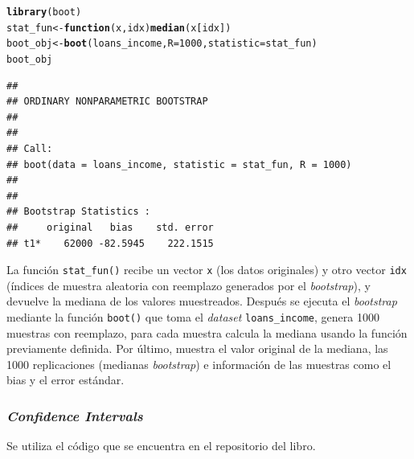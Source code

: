\documentclass[12pt]{article}\usepackage[]{graphicx}\usepackage[]{xcolor}
\makeatletter
\newcommand{\hlnum}[1]{\textcolor[rgb]{0.686,0.059,0.569}{#1}}%
\newcommand{\hldef}[1]{\textcolor[rgb]{0.345,0.345,0.345}{#1}}%
\newcommand{\hlkwa}[1]{\textcolor[rgb]{0.161,0.373,0.58}{\textbf{#1}}}%
\newcommand{\hlkwb}[1]{\textcolor[rgb]{0.69,0.353,0.396}{#1}}%
\newcommand{\hlkwc}[1]{\textcolor[rgb]{0.333,0.667,0.333}{#1}}%
\newcommand{\hlkwd}[1]{\textcolor[rgb]{0.737,0.353,0.396}{\textbf{#1}}}%
\newenvironment{kframe}{%
 \def\at@end@of@kframe{}%
 \ifinner\ifhmode%
  \def\at@end@of@kframe{\end{minipage}}%
  \begin{minipage}{\columnwidth}%
 \fi\fi%
 \def\FrameCommand##1{\hskip\@totalleftmargin \hskip-\fboxsep
 \colorbox{shadecolor}{##1}\hskip-\fboxsep
     \hskip-\linewidth \hskip-\@totalleftmargin \hskip\columnwidth}%
 \MakeFramed {\advance\hsize-\width
   \@totalleftmargin\z@ \linewidth\hsize
   \@setminipage}}%
 {\par\unskip\endMakeFramed%
 \at@end@of@kframe}
\newenvironment{knitrout}{}{} %
\makeatother
\begin{document}
\begin{knitrout}
\color{fgcolor}\begin{kframe}
\begin{alltt}
\hlkwd{library}\hldef{(boot)}
\hldef{stat_fun} \hlkwb{<-} \hlkwa{function}\hldef{(}\hlkwc{x}\hldef{,} \hlkwc{idx}\hldef{)} \hlkwd{median}\hldef{(x[idx])}
\hldef{boot_obj} \hlkwb{<-} \hlkwd{boot}\hldef{(loans_income,} \hlkwc{R}\hldef{=}\hlnum{1000}\hldef{,} \hlkwc{statistic}\hldef{=stat_fun)}
\hldef{boot_obj}
\end{alltt}
\begin{verbatim}
## 
## ORDINARY NONPARAMETRIC BOOTSTRAP
## 
## 
## Call:
## boot(data = loans_income, statistic = stat_fun, R = 1000)
## 
## 
## Bootstrap Statistics :
##     original   bias    std. error
## t1*    62000 -82.5945    222.1515
\end{verbatim}
\end{kframe}
\end{knitrout}

La función \lstinline|stat_fun()| recibe un vector \lstinline|x| (los datos originales) y otro vector \lstinline|idx| (índices de muestra aleatoria con reemplazo generados por el \textit{bootstrap}), y devuelve la mediana de los valores muestreados. Después se ejecuta el \textit{bootstrap} mediante la función \lstinline|boot()| que toma el \textit{dataset} \lstinline|loans_income|, genera 1000 muestras con reemplazo, para cada muestra calcula la mediana usando la función previamente definida. Por último, muestra el valor original de la mediana, las 1000 replicaciones (medianas \textit{bootstrap}) e información de las muestras como el bias y el error estándar.

\subsubsection{\textit{Confidence Intervals}}

Se utiliza el código que se encuentra en el repositorio del libro.
\end{document}
